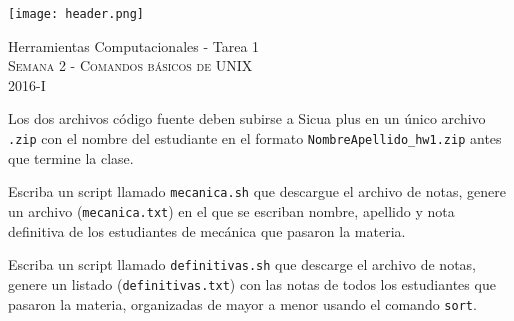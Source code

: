 \documentclass[11pt,letterpaper]{exam}
\begin{document}
\begin{center}

\texttt{[image: header.png]}

\vspace{1.0cm}
{\Large Herramientas Computacionales - Tarea 1} \\
\textsc{Semana 2 - Comandos b\'asicos de UNIX}\\
2016-I\\
\end{center}



\vspace{0.5cm}

\noindent
Los dos archivos c\'odigo fuente deben subirse a Sicua plus en un \'unico archivo
\verb".zip" con el nombre del estudiante en el formato \verb"NombreApellido_hw1.zip" antes que termine la clase.

\vspace{0.5cm}

\begin{questions}
 

Escriba un script llamado \verb"mecanica.sh" que descargue el archivo de notas,
genere un archivo 
(\verb"mecanica.txt") en el que se escriban nombre, apellido y nota definitiva
de los estudiantes de mecánica que pasaron la materia.



Escriba un script llamado \verb"definitivas.sh" que descarge el archivo de notas, genere un listado 
(\verb"definitivas.txt") con las notas de todos los estudiantes que pasaron 
la materia, organizadas de mayor a menor usando el comando \verb"sort".



\end{questions}
\end{document}

